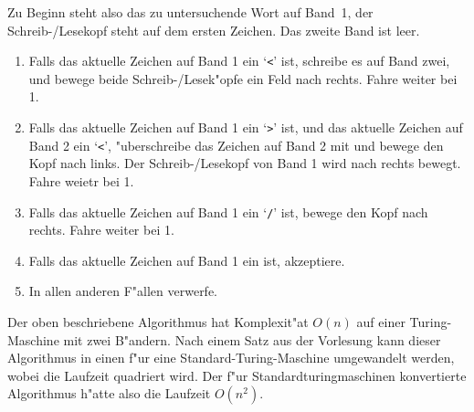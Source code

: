 \begin{loesung}
\begin{teilaufgaben}
Zu Beginn steht also das zu untersuchende Wort auf Band~1,
der Schreib-/Lesekopf steht auf dem ersten Zeichen.
Das zweite Band ist leer.
{
\renewcommand{\theenumii}{\arabic{enumii}}
\renewcommand{\labelenumii}{\theenumii.}
\begin{enumerate}
\item Falls das aktuelle Zeichen auf Band 1 ein `{\tt <}' ist,
schreibe es auf Band zwei, und bewege beide Schreib-/Lesek"opfe ein
Feld nach rechts. Fahre weiter bei 1.
\item Falls das aktuelle Zeichen auf Band 1 ein `{\tt >}' ist,
und das aktuelle Zeichen auf Band 2 ein `{\tt <}', "uberschreibe
das Zeichen auf Band 2 mit \textvisiblespace und bewege den Kopf
nach links. Der Schreib-/Lesekopf von Band 1 wird nach rechts bewegt.
Fahre weietr bei 1.
\item Falls das aktuelle Zeichen auf Band 1 ein `{\tt /}' ist, bewege
den Kopf nach rechts.
Fahre weiter bei 1.
\item Falls das aktuelle Zeichen auf Band 1 ein \textvisiblespace{} ist,
akzeptiere.
\item In allen anderen F"allen verwerfe.
\end{enumerate}
}
\item
Der oben beschriebene Algorithmus hat Komplexit"at $O(n)$ auf einer 
Turing-Maschine mit zwei B"andern. Nach einem Satz aus der Vorlesung
kann dieser Algorithmus in einen f"ur eine Standard-Turing-Maschine
umgewandelt werden, wobei die Laufzeit quadriert wird. Der f"ur 
Standardturingmaschinen konvertierte Algorithmus h"atte also die
Laufzeit $O(n^2)$.
\end{teilaufgaben}
\end{loesung}
